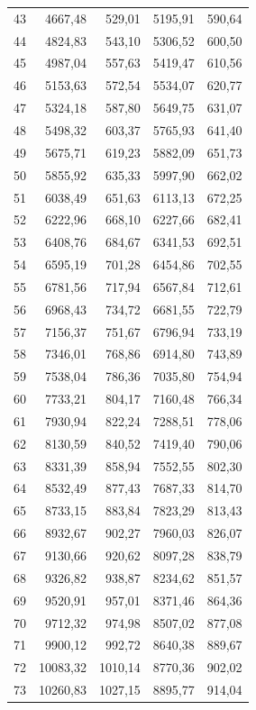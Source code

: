 \begin{small}
\begin{longtable}{rrrrr}
43 & 4667,48 & 529,01 & 5195,91 & 590,64 \\
44 & 4824,83 & 543,10 & 5306,52 & 600,50 \\
45 & 4987,04 & 557,63 & 5419,47 & 610,56 \\
46 & 5153,63 & 572,54 & 5534,07 & 620,77 \\
47 & 5324,18 & 587,80 & 5649,75 & 631,07 \\
48 & 5498,32 & 603,37 & 5765,93 & 641,40 \\
49 & 5675,71 & 619,23 & 5882,09 & 651,73 \\
50 & 5855,92 & 635,33 & 5997,90 & 662,02 \\
51 & 6038,49 & 651,63 & 6113,13 & 672,25 \\
52 & 6222,96 & 668,10 & 6227,66 & 682,41 \\
53 & 6408,76 & 684,67 & 6341,53 & 692,51 \\
54 & 6595,19 & 701,28 & 6454,86 & 702,55 \\
55 & 6781,56 & 717,94 & 6567,84 & 712,61 \\
56 & 6968,43 & 734,72 & 6681,55 & 722,79 \\
57 & 7156,37 & 751,67 & 6796,94 & 733,19 \\
58 & 7346,01 & 768,86 & 6914,80 & 743,89 \\
59 & 7538,04 & 786,36 & 7035,80 & 754,94 \\
60 & 7733,21 & 804,17 & 7160,48 & 766,34 \\
61 & 7930,94 & 822,24 & 7288,51 & 778,06 \\
62 & 8130,59 & 840,52 & 7419,40 & 790,06 \\
63 & 8331,39 & 858,94 & 7552,55 & 802,30 \\
64 & 8532,49 & 877,43 & 7687,33 & 814,70 \\
65 & 8733,15 & 883,84 & 7823,29 & 813,43 \\
66 & 8932,67 & 902,27 & 7960,03 & 826,07 \\
67 & 9130,66 & 920,62 & 8097,28 & 838,79 \\
68 & 9326,82 & 938,87 & 8234,62 & 851,57 \\
69 & 9520,91 & 957,01 & 8371,46 & 864,36 \\
70 & 9712,32 & 974,98 & 8507,02 & 877,08 \\
71 & 9900,12 & 992,72 & 8640,38 & 889,67 \\
72 & 10083,32 & 1010,14 & 8770,36 & 902,02 \\
73 & 10260,83 & 1027,15 & 8895,77 & 914,04 \\

\end{longtable}
\end{small}
